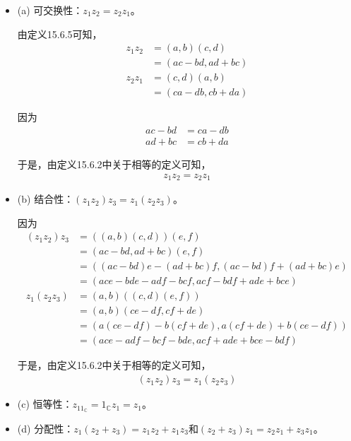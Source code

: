 \documentclass{article}
\begin{document}
\begin{itemize}
  \item (a) 可交换性：$z_1z_2 = z_2z_1$。

        由定义15.6.5可知，
        \begin{align*}
          z_1z_2 & = (a, b)(c, d)       \\
                 & = (ac - bd, ad + bc)
        \end{align*}
        \begin{align*}
          z_2z_1 & = (c, d)(a, b)       \\
                 & = (ca - db, cb + da)
        \end{align*}

        因为
        \begin{align*}
          ac - bd & = ca - db \\
          ad + bc & = cb + da
        \end{align*}

        于是，由定义15.6.2中关于相等的定义可知，
        \begin{align*}
          z_1z_2 = z_2z_1
        \end{align*}

  \item (b) 结合性：$(z_1z_2)z_3 = z_1(z_2z_3)$。

        因为
        \begin{align*}
          (z_1z_2)z_3 & = ((a, b)(c, d))(e, f)                             \\
                      & = (ac - bd, ad + bc)(e, f)                         \\
                      & = ((ac-bd)e - (ad + bc)f, (ac - bd)f + (ad + bc)e) \\
                      & = (ace - bde - adf - bcf, acf - bdf + ade + bce)
        \end{align*}
        \begin{align*}
          z_1(z_2z_3) & = (a, b)((c, d)(e, f))                               \\
                      & = (a, b)(ce - df, cf + de)                           \\
                      & = (a(ce - df) - b(cf + de), a(cf + de) + b(ce - df)) \\
                      & = (ace - adf - bcf - bde, acf + ade + bce - bdf)
        \end{align*}

        于是，由定义15.6.2中关于相等的定义可知，
        \begin{align*}
          (z_1z_2)z_3 = z_1(z_2z_3)
        \end{align*}

  \item (c) 恒等性：$z_11_\mathbb{C} = 1_\mathbb{C}z_1 = z_1$。

  \item (d) 分配性：$z_1(z_2 + z_3) = z_1z_2 + z_1z_3$和$(z_2 + z_3)z_1 = z_2z_1 + z_3z_1$。

\end{itemize}
\end{document}
